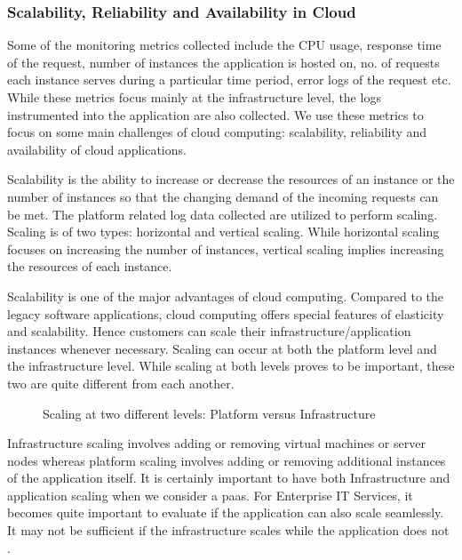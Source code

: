 \documentclass[article,type=msc,colorback,12pt,accentcolor=tud8b,table]{tudthesis}
\begin{document}
		\subsubsection{Scalability, Reliability  and Availability in Cloud}
		
		Some of the monitoring metrics collected include the CPU usage, response time of the request, number of instances the application is hosted on, no. of requests each instance serves during a particular time period, error logs of the request etc. While these metrics focus mainly at the infrastructure level, the logs instrumented into the application are also collected. We use these metrics to focus on some main challenges of cloud computing: scalability, reliability and availability of cloud applications.
		
		\par Scalability is the ability to increase or decrease the resources of an instance or the number of instances so that the changing demand of the incoming requests can be met. The platform related log data collected are utilized to perform scaling. Scaling is of two types: horizontal and vertical scaling. While horizontal scaling focuses on increasing the number of instances, vertical scaling implies increasing the resources of each instance.
		
		Scalability is one of the major advantages of cloud computing. Compared to the legacy software applications, cloud computing offers special features of elasticity and scalability. Hence customers can scale their infrastructure/application instances whenever necessary. Scaling can occur at both the platform level and the infrastructure level. While scaling at both levels proves to be important, these two are quite different from each another. 
		
		\begin{figure}[!h]
			\begin{center}
				\makebox[\textwidth]{\texttt{[image: 2-2]}}
			\end{center}
			\caption{Scaling at two different levels: Platform versus Infrastructure}
			\label{fig:scaling_infra_platform}
		\end{figure}
		
		Infrastructure scaling involves adding or removing virtual machines or server nodes whereas platform scaling involves adding or removing additional instances of the application itself. It is certainly important to have both Infrastructure and application scaling when we consider a \gls{paas}. For Enterprise IT Services, it becomes quite important to evaluate if the application can also scale seamlessly. It may not be sufficient if the infrastructure scales while the application does not \cite{app_infra_scale}. 
		
\end{document}
